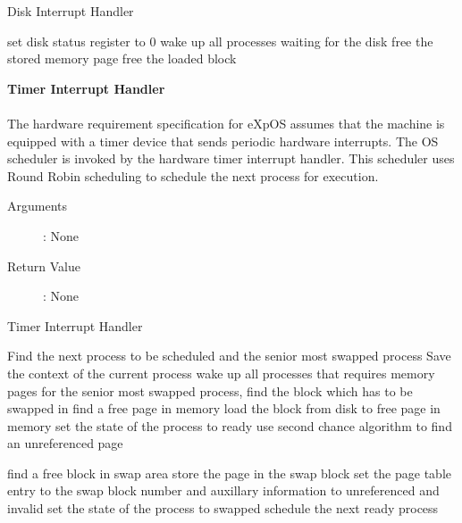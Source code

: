 \documentclass[10pt]{article}
\begin{document}
\begin{algorithm}
\caption{Disk Interrupt Handler}
\begin{algorithmic}
\STATE set disk status register to 0
    \STATE wake up all processes waiting for the disk
\ENDIF
{}
        \STATE free the stored memory page
    \ELSE
            \STATE free the loaded block
        \ENDIF
    \ENDIF
\ENDIF
\RETURN
\end{algorithmic}
\end{algorithm}
\textbf{Timer Interrupt Handler}
\\ \\
 The hardware requirement specification for eXpOS assumes that the machine is equipped with a timer device that sends periodic hardware interrupts. The OS scheduler is invoked by the hardware timer interrupt handler. This scheduler uses Round Robin scheduling to schedule the next process for execution. 
\begin{description}
\item[Arguments]: None
\item[Return Value]: None
\end{description} 
\begin{algorithm}
\caption{Timer Interrupt Handler}
\begin{algorithmic}
\STATE Find the next process to be scheduled and the senior most swapped process
\STATE Save the context of the current process
        \STATE wake up all processes that requires memory pages
    \ELSE
            \STATE for the senior most swapped process, find the block which has to be swapped in
            \STATE find a free page in memory
            \STATE load the block from disk to free page in memory
            \STATE set the state of the process to ready
        \ENDIF
    \ENDIF
\ELSE
        \STATE use second chance algorithm to find an unreferenced page
            
            \STATE find a free block in swap area
            \STATE store the page in the swap block
            \STATE set the page table entry to the swap block number and auxillary information to unreferenced and invalid
                \STATE set the state of the process to swapped
            \ENDIF
        \ENDIF
    \ENDIF
\ENDIF
\STATE schedule the next ready process
\RETURN
\end{algorithmic}
\end{algorithm}
\vspace{30mm}
\end{document}

